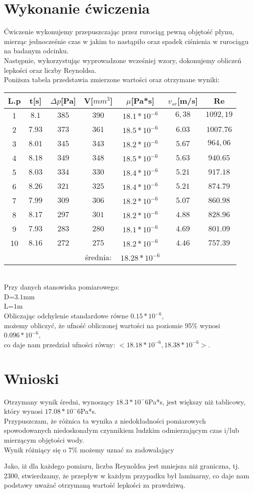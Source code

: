 \documentclass[a4paper,12pt]{article}
\begin{document}
\section{Wykonanie ćwiczenia}
Ćwiczenie wykonujemy przepuszczając przez rurociąg pewną objętość płynu, mierząc jednocześnie czas w jakim to nastąpiło oraz spadek ciśnienia w rurociągu na badanym odcinku.\\
Następnie, wykorzystując wyprowadzone wcześniej wzory, dokonujemy obliczeń lepkości oraz liczby Reynoldsa.\\
Poniższa tabela przedstawia zmierzone wartości oraz otrzymane wyniki:\\
\begin{tabular}{|c|c|c|c|c|c|c|}
\hline
L.p&t[s]&$\Delta p$[Pa]&V[$mm^3$]&$\mu$[Pa*s]&$v_{sr}$[m/s]&Re\\
\hline
1&$8.1$&$385$&$390$&$18.1*10^{-6}$&$6,38$&$1092,19$\\
2&$7.93$&$373$&$361$&$18.5*10^{-6}$&$6.03$&$1007.76$\\
3&$8.01$&$345$&$343$&$18.2*10^{-6}$&$5.67$&$964,06$\\
4&$8.18$&$349$&$348$&$18.5*10^{-6}$&$5.63$&$940.65$\\
5&$8.03$&$334$&$330$&$18.4*10^{-6}$&$5.21$&$917.18$\\
6&$8.26$&$321$&$325$&$18.4*10^{-6}$&$5.21$&$874.79$\\
7&$7.99$&$309$&$306$&$18.2*10^{-6}$&$5.07$&$860.98$\\
8&$8.17$&$297$&$301$&$18.2*10^{-6}$&$4.88$&$828.96$\\
9&$7.93$&$283$&$280$&$18.1*10^{-6}$&$4.69$&$801.09$\\
10&$8.16$&$272$&$275$&$18.2*10^{-6}$&$4.46$&$757.39$\\
\hline
&&&średnia:&$18.28*10^{-6}$&&\\
\hline
\end{tabular}\\
Przy danych stanowiska pomiarowego:\\
D=$3.1$mm\\
L=$1$m\\
Obliczając odchylenie standardowe równe $0.15*10^{-6}$,\\
możemy obliczyć, że ufność obliczonej wartości na poziomie 95\% wynosi $0.096*10^{-6}$,\\
co daje nam przedział ufności równy: $<18.18*10^{-6},18.38*10^{-6}>$.
\section{Wnioski}
Otrzymany wynik średni, wynoszący $18.3*10^-6$Pa*s, jest większy niż tablicowy, który wynosi $17.08*10^-6$Pa*s.\\
Przypuszczam, że różnica ta wynika z niedokładności pomiarowych spowodowanych niedoskonałym czynnikiem ludzkim odmierzającym czas i/lub mierzącym objętości wody.\\
Wynik różniący się o 7\% możemy uznać za zadowalający

Jako, iż dla każdego pomiaru, liczba Reynoldsa jest mniejsza niż graniczna, tj. 2300, stwierdzamy, że przepływ w każdym przypadku był laminarny, co daje nam podstawy uważać otrzymaną wartość lepkości za prawdziwą.
\end{document}
